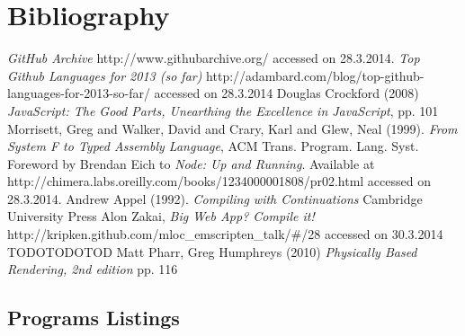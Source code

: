 \documentclass[11pt]{report}
\begin{document}
\newpage

\chapter{Bibliography}
\begin{thebibliography}{1}
     {\em GitHub Archive} http://www.githubarchive.org/ accessed on 28.3.2014.
     {\em Top Github Languages for 2013 (so far)} http://adambard.com/blog/top-github-languages-for-2013-so-far/ accessed on 28.3.2014
     Douglas Crockford (2008) {\em JavaScript: The Good Parts, Unearthing the Excellence in JavaScript}, pp. 101
     Morrisett, Greg and Walker, David and Crary, Karl and Glew, Neal (1999). {\em From System F to Typed Assembly Language}, ACM Trans. Program. Lang. Syst.
     Foreword by Brendan Eich to {\em Node: Up and Running}. Available at http://chimera.labs.oreilly.com/books/1234000001808/pr02.html accessed on 28.3.2014.
     Andrew Appel (1992). {\em Compiling with Continuations} Cambridge University Press
     Alon Zakai, {\em Big Web App? Compile it!} http://kripken.github.com/mloc_emscripten_talk/\#/28 accessed on 30.3.2014
     TODOTODOTOD
     Matt Pharr, Greg Humphreys (2010) {\em Physically Based Rendering, 2nd edition} pp. 116
\end{thebibliography}



\begin{appendices}



\chapter{Programs Listings}

\end{appendices}
\end{document}
